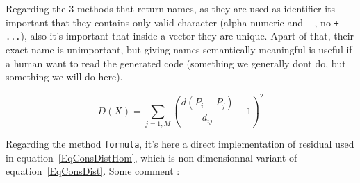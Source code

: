 Regarding the $3$ methods that  return names, as they are used as \CPP identifier
its important that they contains only valid character (alpha numeric and {\tt\_} ,
no {\tt + - ...}),  also it's important that  inside a vector they are unique.
Apart of that, their exact name is unimportant, but giving names semantically
meaningful is useful if a human want to read the generated code (something we
generally dont do, but something we will do here).

\begin{equation}
      D(X) = \sum_{j=1,M} (\frac{d(P_i-P_j)}{d_{ij}} - 1)^2  \label{EqConsDistHom}
\end{equation}

Regarding the method  {\tt formula}, it's here a direct implementation 
of residual used in  equation~\ref{EqConsDistHom}, which
is non dimensionnal variant of equation~\ref{EqConsDist}. Some comment :

